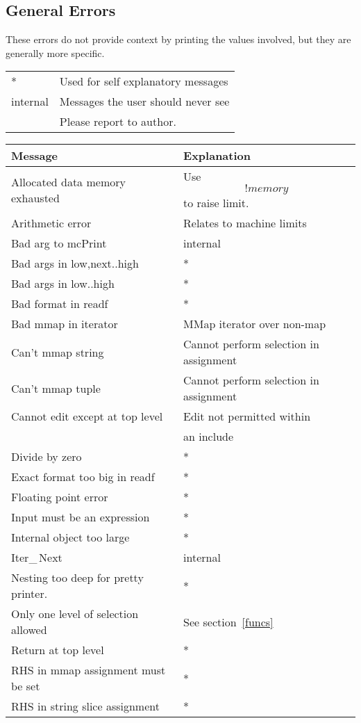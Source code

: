 {{\subsection{General Errors}
These errors do not provide context by printing the values involved,
but they are generally more specific.
\nopagebreak
\begin{center}
\nopagebreak
\begin{tabular}{l l}
*&		Used for self explanatory messages\\
internal&	Messages the user should never see\\
 &		Please report to author.
\end{tabular}
\nopagebreak\par\nopagebreak\noindent
\begin{tabular}{l l}
\bf Message	&		\bf Explanation\\\hline
Allocated data memory exhausted&	Use \[!memory\] to raise limit.\\
Arithmetic error&		Relates to machine limits \\
Bad arg to mcPrint&			internal\\
Bad args in low,next..high&		*\\
Bad args in low..high&			*\\
Bad format in readf&			*\\
Bad mmap in iterator&			MMap iterator over non-map\\
Can't mmap string&		Cannot perform selection in assignment\\
Can't mmap tuple&		Cannot perform selection in assignment\\
Cannot edit except at top level&	Edit not permitted within \\
&					an include\\
Divide by zero&				*\\
Exact format too big in readf&		*\\
Floating point error&			*\\
Input must be an expression&		*\\
Internal object too large&		*\\
Iter\_\,Next&				internal\\
Nesting too deep for pretty printer.&	*\\
Only one level of selection allowed&	See section~\ref{funcs}\\
Return at top level&				*\\
RHS in mmap assignment must be set&		*\\
RHS in string slice assignment &		*\\

\end{tabular}
\end{center}}}
